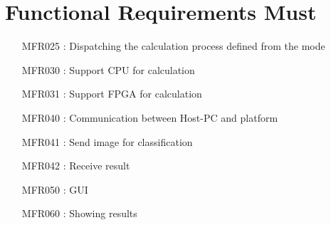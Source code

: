 \documentclass[parskip=full]{scrartcl}
\begin{document}
\section{Functional Requirements Must}
\begin{itemize}[nosep]
\item [MFR025]: Dispatching the calculation process defined from the mode
\item [MFR030]: Support CPU for calculation
\item [MFR031]: Support FPGA for calculation
\item [MFR040]: Communication between Host-PC and platform
\item [MFR041]: Send image for classification
\item [MFR042]: Receive result
\item [MFR050]: GUI
\item [MFR060]: Showing results
\end{itemize}
\end{document}

